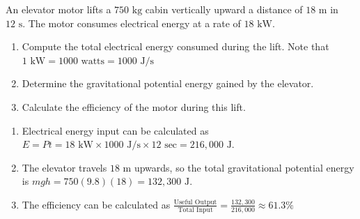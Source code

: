 \begin{Exercise}[title=Elevator Lift, label = elevatorPE]
An elevator motor lifts a $750 \text{ kg}$ cabin vertically upward a distance of $18 \text{ m}$ in $12 \text{ s}$. The motor consumes electrical energy at a rate of 
$18 \text{ kW}$. 

\begin{enumerate}[label=(\alph*)]
  \item Compute the total electrical energy consumed during the lift. Note that $1 \text{ kW} = 1000 \text{ watts} = 1000 \text{ J/s}$
  \item Determine the gravitational potential energy gained by the elevator.
  \item Calculate the efficiency of the motor during this lift.
\end{enumerate}

\end{Exercise}
\begin{Answer}[ref=elevatorPE]
  
\begin{enumerate}[label=(\alph*)]
  \item Electrical energy input can be calculated as $E= Pt = 18 \text{ kW} \times 1000 \text{ J/s} \times 12 \text{ sec} = 216,000 \text{ J}$. 
  \item The elevator travels $18 \text{ m}$ upwards, so the total gravitational potential energy is $mgh = 750(9.8)(18) = 132,300 \text{ J}$. 
  \item The efficiency can be calculated as $\frac{\text{Useful Output}}{\text{Total Input}} = \frac{132,300}{216,000} \approx 61.3\%$
\end{enumerate}
\end{Answer}

